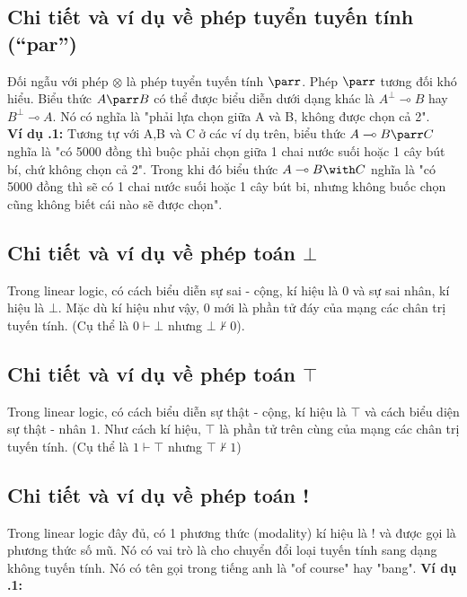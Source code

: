 \documentclass[a4paper]{article}
\begin{document}
\subsection{Chi tiết và ví dụ về phép tuyển tuyến tính (“par”)}
Đối ngẫu với phép $\otimes$ là phép tuyển tuyến tính $\parr$. Phép $\parr$ tương đối khó hiểu. Biểu thức $A \parr B$ có thể được biểu diễn dưới dạng khác là $A^{\bot} \multimap B$ hay $B^{\bot} \multimap A$. Nó có nghĩa là "phải lựa chọn giữa A và B, không được chọn cả 2".\\

\textbf{Ví dụ \thesubsection.1:} Tương tự với A,B và C ở các ví dụ trên, biểu thức $A \multimap B \parr C$ nghĩa là "có 5000 đồng thì buộc phải chọn giữa 1 chai nước suối hoặc 1 cây bút bí, chứ không chọn cả 2". Trong khi đó biểu thức $A \multimap B \with C$ nghĩa là "có 5000 đồng thì sẽ có 1 chai nước suối hoặc 1 cây bút bi, nhưng không buốc chọn cũng không biết cái nào sẽ được chọn".

\subsection{Chi tiết và ví dụ về phép toán $\bot$}
Trong linear logic, có cách biểu diễn sự sai - cộng, kí hiệu là $0$ và sự sai nhân, kí hiệu là $\bot$. Mặc dù kí hiệu như vậy, $0$ mới là phần tử đáy của mạng các chân trị tuyến tính. (Cụ thể là $0 \vdash \bot$ nhưng $\bot \nvdash 0$).

\subsection{Chi tiết và ví dụ về phép toán $\top$}
Trong linear logic, có cách biểu diễn sự thật - cộng, kí hiệu là $\top$ và cách biểu diện sự thật - nhân $1$. Như cách kí hiệu, $\top$ là phần tử trên cùng của mạng các chân trị tuyến tính. (Cụ thể là $1 \vdash \top$ nhưng $\top \nvdash 1$)


\subsection{Chi tiết và ví dụ về phép toán !}
Trong linear logic đây đủ, có 1 phương thức (modality) kí hiệu là $!$ và được gọi là phương thức số mũ. Nó có vai trò là cho chuyển đổi loại tuyến tính sang dạng không tuyến tính. Nó có tên gọi trong tiếng anh là "of course" hay "bang".
\textbf{Ví dụ \thesubsection.1:}
\end{document}
